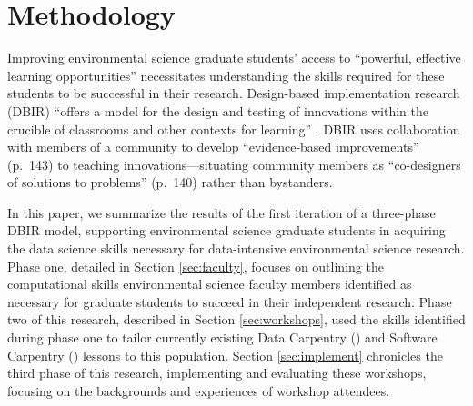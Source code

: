 \documentclass[12pt]{article}
\begin{document}

\section{Methodology}

\noindent Improving environmental science graduate students' access to 
``powerful, effective learning opportunities'' \citep[p.\ 137]{penuel}
necessitates understanding the skills required for these students to be
successful in their research. Design-based implementation research (DBIR) 
\citep{confrey, penuel, oneill} ``offers a model for the design and testing of
innovations within the crucible of classrooms and other contexts for learning'' 
\citep[p.\ 140]{penuel}. DBIR uses collaboration with members of a
community to develop ``evidence-based improvements'' (p.\ 143) to teaching 
innovations---situating community members as ``co-designers of solutions to 
problems'' (p.\ 140) rather than bystanders. 

\quad In this paper, we summarize the results of the first iteration of a
three-phase DBIR model, supporting environmental science graduate students in
acquiring the data science skills necessary for data-intensive environmental 
science research. Phase one, detailed in Section \ref{sec:faculty}, focuses on
outlining the computational skills environmental science faculty members
identified as necessary for graduate students to succeed in their independent
research. Phase two of this research, described in Section \ref{sec:workshops},
used the skills identified during phase one to tailor currently existing Data 
Carpentry (\citeyear{data-carpentry}) and Software Carpentry 
(\citeyear{software-carpentry}) lessons to this population. Section 
\ref{sec:implement} chronicles the third phase of this research, implementing
and evaluating these workshops, focusing on the backgrounds and experiences of
workshop attendees. 

\end{document}
